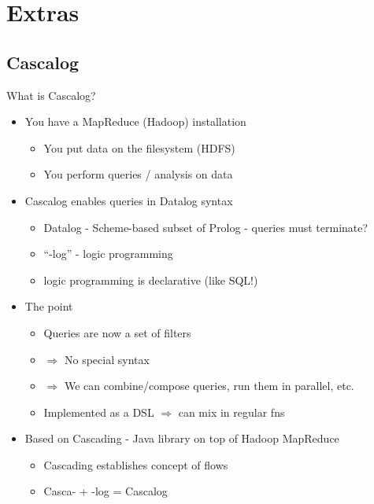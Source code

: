 \documentclass{beamer}
\begin{document}
\section{Extras}

\subsection{Cascalog}

\begin{frame}[allowframebreaks]{What is Cascalog?}
  \begin{itemize}
  \item You have a MapReduce (Hadoop) installation
    \begin{itemize}
    \item You put data on the filesystem (HDFS)
    \item You perform queries / analysis on data
    \end{itemize}
  \item Cascalog enables queries in Datalog syntax
    \begin{itemize}
    \item Datalog - Scheme-based subset of Prolog - queries must
      terminate?
    \item ``-log'' - logic programming
    \item logic programming is declarative (like SQL!)
    \end{itemize}

    \framebreak

  \item The point
    \begin{itemize}
    \item Queries are now a set of filters
    \item $\Rightarrow$ No special syntax
    \item $\Rightarrow$ We can combine/compose queries, run them in
      parallel, etc.
    \item Implemented as a DSL $\Rightarrow$ can mix in regular fns
    \end{itemize}
  \item Based on Cascading - Java library on top of Hadoop MapReduce
    \begin{itemize}
    \item Cascading establishes concept of flows
    \item Casca- + -log = Cascalog
    \end{itemize}
  \end{itemize}
\end{frame}
\end{document}
